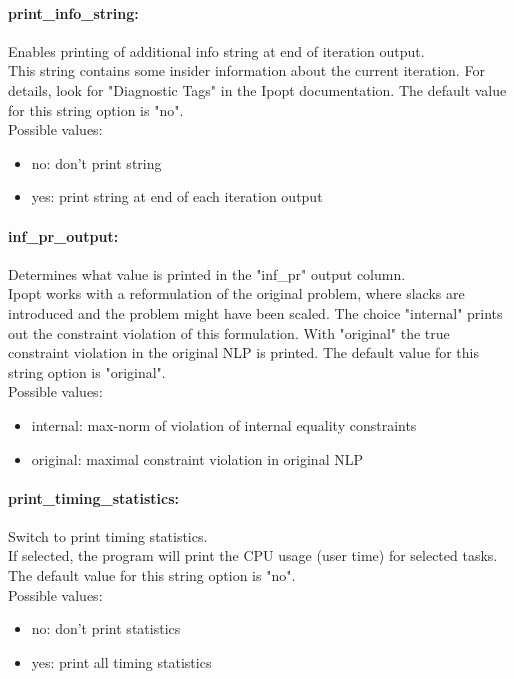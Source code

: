 \paragraph{print\_info\_string:}\label{opt:print_info_string} Enables printing of additional info string at end of iteration output. \\
 This string contains some insider information
about the current iteration.  For details, look
for "Diagnostic Tags" in the Ipopt documentation. The default value for this string option is "no".
\\ 
Possible values:
\begin{itemize}
   \item no: don't print string
   \item yes: print string at end of each iteration output
\end{itemize}

\paragraph{inf\_pr\_output:}\label{opt:inf_pr_output} Determines what value is printed in the "inf\_pr" output column. \\
 Ipopt works with a reformulation of the original
problem, where slacks are introduced and the
problem might have been scaled.  The choice
"internal" prints out the constraint violation of
this formulation. With "original" the true
constraint violation in the original NLP is
printed. The default value for this string option is "original".
\\ 
Possible values:
\begin{itemize}
   \item internal: max-norm of violation of internal equality
constraints
   \item original: maximal constraint violation in original NLP
\end{itemize}

\paragraph{print\_timing\_statistics:}\label{opt:print_timing_statistics} Switch to print timing statistics. \\
 If selected, the program will print the CPU usage
(user time) for selected tasks. The default value for this string option is "no".
\\ 
Possible values:
\begin{itemize}
   \item no: don't print statistics
   \item yes: print all timing statistics
\end{itemize}

